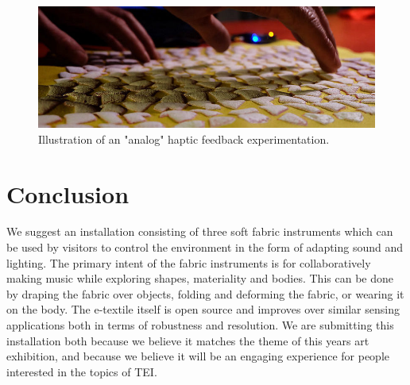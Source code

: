 \documentclass{sigchi-ext}
\begin{document}
\begin{figure}[h!]
    \centering
    \includegraphics[width=\columnwidth]{figures/zoom}
    \caption{Illustration of an "analog" haptic feedback experimentation.}\label{fig:zoom}
\end{figure}

\section{Conclusion}
We suggest an installation consisting of three soft fabric instruments which can be used by visitors to control the environment in the form of adapting sound and lighting. The primary intent of the fabric instruments is for collaboratively making music while exploring shapes, materiality and bodies. This can be done by draping the fabric over objects, folding and deforming the fabric, or wearing it on the body. The e-textile itself is open source and improves over similar sensing applications both in terms of robustness and resolution. We are submitting this installation both because we believe it matches the theme of this years art exhibition, and because we believe it will be an engaging experience for people interested in the topics of TEI.





\end{document}
